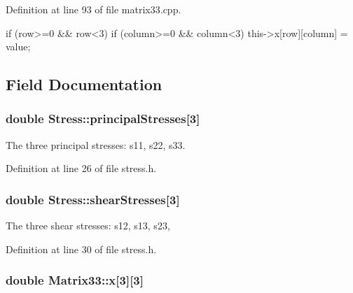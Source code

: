 \-Definition at line 93 of file matrix33.\-cpp.


\begin{DoxyCode}
{
  if (row>=0 && row<3)
    {
      if (column>=0 && column<3)
        {
          this->x[row][column] = value;
        }
    }
}
\end{DoxyCode}


\subsection{\-Field \-Documentation}
\hypertarget{classStress_aea8c3e40aa59a89d7ba79d2c916050a6}{
\subsubsection[{principal\-Stresses}]{\setlength{\rightskip}{0pt plus 5cm}double {\bf \-Stress\-::principal\-Stresses}\mbox{[}3\mbox{]}}}\label{d1/d1c/classStress_aea8c3e40aa59a89d7ba79d2c916050a6}
\-The three principal stresses\-: s11, s22, s33. 

\-Definition at line 26 of file stress.\-h.

\hypertarget{classStress_a77e8705e56c2fb56826a638edf3f78bf}{
\subsubsection[{shear\-Stresses}]{\setlength{\rightskip}{0pt plus 5cm}double {\bf \-Stress\-::shear\-Stresses}\mbox{[}3\mbox{]}}}\label{d1/d1c/classStress_a77e8705e56c2fb56826a638edf3f78bf}
\-The three shear stresses\-: s12, s13, s23, 

\-Definition at line 30 of file stress.\-h.

\hypertarget{classMatrix33_af7f01fa466616eb7c8eda2e4d9f85cdd}{
\subsubsection[{x}]{\setlength{\rightskip}{0pt plus 5cm}double {\bf \-Matrix33\-::x}\mbox{[}3\mbox{]}\mbox{[}3\mbox{]}}}\label{de/d82/classMatrix33_af7f01fa466616eb7c8eda2e4d9f85cdd}


